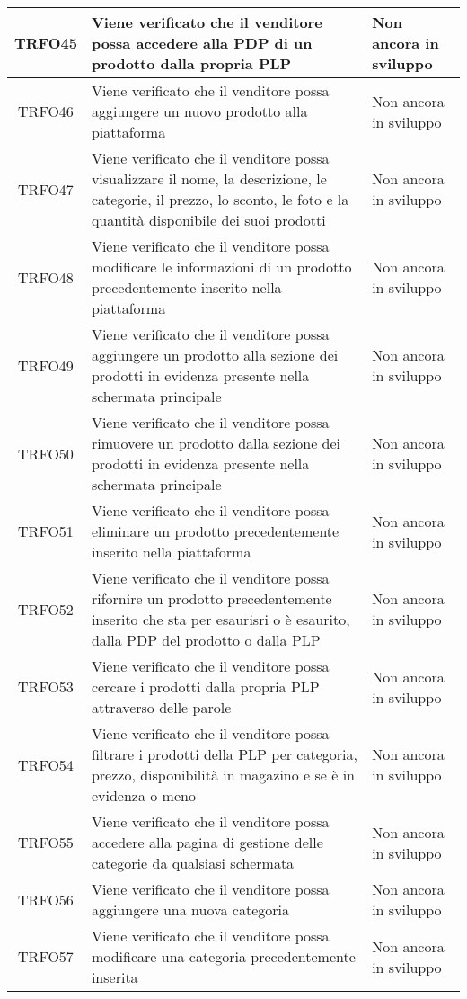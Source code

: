 \begin{longtable}{|c| C{10cm} |C{3cm}|}
	TRFO45 & Viene verificato che il venditore possa accedere alla PDP di un prodotto dalla propria PLP & Non ancora in sviluppo\\ \hline
    	TRFO46 & Viene verificato che il venditore possa aggiungere un nuovo prodotto alla piattaforma & Non ancora in sviluppo\\ \hline
    	TRFO47 & Viene verificato che il venditore possa visualizzare il nome, la descrizione, le categorie, il prezzo, lo sconto, le foto e la quantità disponibile dei suoi prodotti & Non ancora in sviluppo\\ \hline
    	TRFO48 & Viene verificato che il venditore possa modificare le informazioni di un prodotto precedentemente inserito nella piattaforma & Non ancora in sviluppo\\ \hline
    	TRFO49 & Viene verificato che il venditore possa aggiungere un prodotto alla sezione dei prodotti in evidenza presente nella schermata principale & Non ancora in sviluppo\\ \hline
    	TRFO50 & Viene verificato che il venditore possa rimuovere un prodotto dalla sezione dei prodotti in evidenza  presente nella schermata principale & Non ancora in sviluppo\\ \hline
    	TRFO51 & Viene verificato che il venditore possa eliminare un prodotto precedentemente inserito nella piattaforma & Non ancora in sviluppo\\ \hline
    	TRFO52 & Viene verificato che il venditore possa rifornire un prodotto precedentemente inserito che sta per esaurisri o è esaurito, dalla PDP del prodotto o dalla PLP & Non ancora in sviluppo\\ \hline
   	TRFO53 & Viene verificato che il venditore possa cercare i prodotti dalla propria PLP attraverso delle parole & Non ancora in sviluppo\\ \hline
    	TRFO54 & Viene verificato che il venditore possa filtrare i prodotti della PLP per categoria, prezzo, disponibilità in magazino e se è in evidenza o meno & Non ancora in sviluppo\\ \hline
	TRFO55 & Viene verificato che il venditore possa accedere alla pagina di gestione delle categorie da qualsiasi schermata & Non ancora in sviluppo\\ \hline
    	TRFO56 & Viene verificato che il venditore possa aggiungere una nuova categoria & Non ancora in sviluppo\\ \hline
    	TRFO57 & Viene verificato che il venditore possa modificare una categoria precedentemente inserita & Non ancora in sviluppo\\ \hline

\end{longtable}
